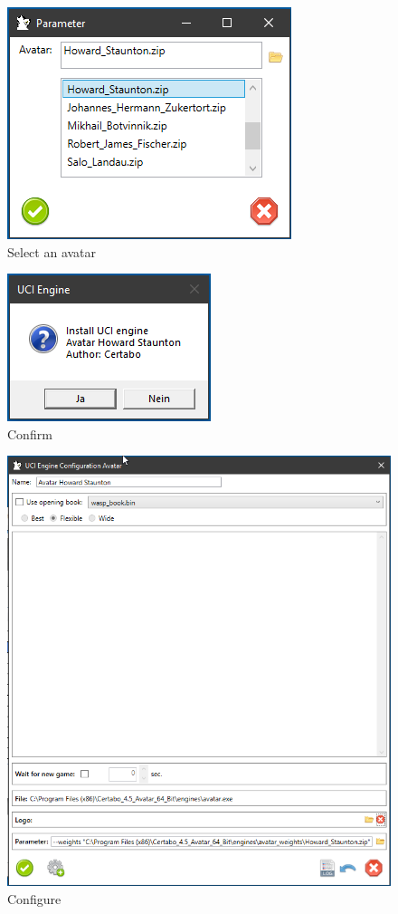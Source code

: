 \documentclass[11pt,a4paper]{article}
\begin{document}
\begin{figure}[H]
	\centering
	\includegraphics[scale=0.9]{avatar1.png}
	\caption{Select an avatar}
	\label{fig:Avatar1}
\end{figure}

\begin{figure}[H]
	\centering
	\includegraphics[scale=0.9]{avatar2.png}
	\caption{Confirm}
	\label{fig:Avatar2}
\end{figure}

\begin{figure}[H]
	\centering
	\includegraphics[scale=0.7]{avatar3.png}
	\caption{Configure}
	\label{fig:Avatar3}
\end{figure}
\end{document}
